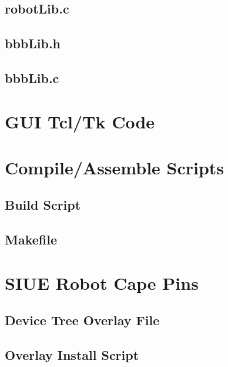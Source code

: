 \documentclass[12pt,oneside,final]{siuethesis}
\theoremstyle{definition}
\begin{document}
\section{robotLib.c}

\newpage
\section{bbbLib.h}

\newpage
\section{bbbLib.c}


\chapter{GUI Tcl/Tk Code}
\lstset{language=[tk]tcl}


\chapter{Compile/Assemble Scripts}

\section{Build Script}
\lstset{language=sh}

\newpage
\section{Makefile}
\lstset{language=make}


\chapter{SIUE Robot Cape Pins}
\section{Device Tree Overlay File}

\newpage
\section{Overlay Install Script}
\lstset{language=sh}

\newpage
\end{document}
